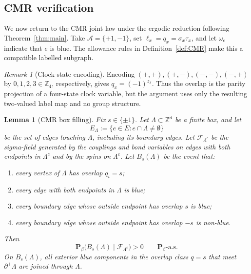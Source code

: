 \documentclass[11pt]{article}
\newtheorem{lemma}[theorem]{Lemma}
\numberwithin{theorem}{section}
\theoremstyle{remark}
\newtheorem{remark}[theorem]{Remark}
\begin{document}
\subsection{CMR verification}\label{sec:cmr-coalescence}

We now return to the CMR joint law under the ergodic reduction following Theorem~\ref{thm:main}.
Take $\mathcal{A}=\{+1,-1\}$, set $\ell_x=q_x=\sigma_x\tau_x$, and let $\omega_e$ indicate that $e$ is blue.
The allowance rules in Definition~\ref{def:CMR} make this a compatible labelled subgraph.

\begin{remark}[Clock-state encoding]
Encoding $(+,+),(+,-),(-,-),(-,+)$ by $0,1,2,3\in\mathbb{Z}_4$, respectively, gives $q_x=(-1)^{z_x}$.
Thus the overlap is the parity projection of a four-state clock variable, but the argument uses only the resulting two-valued label map and no group structure.
\end{remark}

\begin{lemma}[CMR box filling]\label{lem:resample}
Fix $s\in\{\pm1\}$.
Let $\Lambda\subset\mathbb{Z}^d$ be a finite box, and let
\[
  E_\Lambda:=\{e\in E:e\cap\Lambda\neq\emptyset\}
\]
be the set of edges touching $\Lambda$, including its boundary edges.
Let $\mathscr{F}_{\Lambda^c}$ be the sigma-field generated by the couplings and bond variables on edges with both endpoints in $\Lambda^c$ and by the spins on $\Lambda^c$.
Let $B_s(\Lambda)$ be the event that:
\begin{enumerate}
\item[\textup{(i)}] every vertex of $\Lambda$ has overlap $q_i=s$;
\item[\textup{(ii)}] every edge with both endpoints in $\Lambda$ is blue;
\item[\textup{(iii)}] every boundary edge whose outside endpoint has overlap $s$ is blue;
\item[\textup{(iv)}] every boundary edge whose outside endpoint has overlap $-s$ is non-blue.
\end{enumerate}
Then
\[
  \mathbf{P}_\beta\bigl(B_s(\Lambda)
       \mid\mathscr{F}_{\Lambda^c}\bigr)>0
  \qquad \mathbf{P}_\beta\text{-a.s.}
\]
On $B_s(\Lambda)$, all exterior blue components in the overlap class $q=s$ that meet $\partial^+\Lambda$ are joined through $\Lambda$.
\end{lemma}
\end{document}

